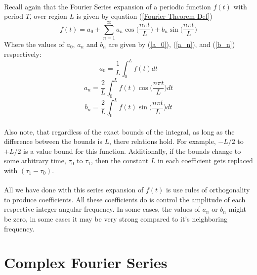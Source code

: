 \documentclass[12pt,letterpaper]{article}
\begin{document}
\paragraph*{}Recall again that the Fourier Series expansion of a periodic function $f(t)$ with period $T$, over region $L$ is given by equation (\ref{Fourier Theorem Def})
\begin{equation}
f(t) = a_0 + \sum_{n=1}^{\infty} a_n \cos\Big(\frac{n\pi t}{L}\Big) + b_n \sin\Big(\frac{n\pi t}{L}\Big)
\end{equation} 
Where the values of $a_0$, $a_n$ and $b_n$ are given by (\ref{a_0}), (\ref{a_n}), and (\ref{b_n}) respectively:
\begin{equation}
a_0 = \frac{1}{L}\int_0^L f(t) dt
\end{equation}
\begin{equation}
a_n = \frac{2}{L}\int_0^L f(t)\cos\Big(\frac{n\pi t}{L}\Big) dt
\end{equation}
\begin{equation}
b_n = \frac{2}{L}\int_0^L f(t)\sin\Big(\frac{n\pi t}{L}\Big) dt
\end{equation}
\paragraph*{}Also note, that regardless of the exact bounds of the integral, as long as the difference between the bounds is $L$, there relations hold. For example, $-L/2$ to $+L/2$ is a value bound for this function. Additionally, if the bounds change to some arbitrary time, $\tau_0$ to $\tau_1$, then the constant $L$ in each coefficient gets replaced with $(\tau_1 - \tau_0)$.
\paragraph*{}All we have done with this series expansion of $f(t)$ is use rules of orthogonality to produce coefficients. All these coefficients do is control the amplitude of each respective integer angular frequency. In some cases, the values of $a_n$ or $b_n$ might be zero, in some cases it may be very strong compared to it's neighboring frequency.
 

\section{Complex Fourier Series}
\end{document}
